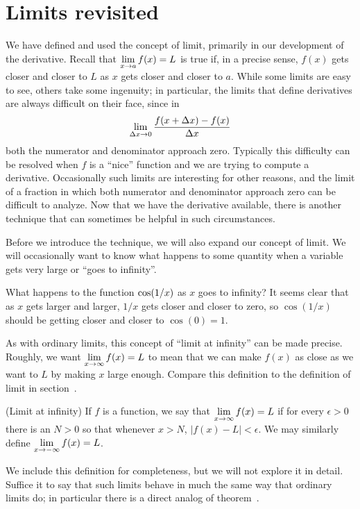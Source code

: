 \section{Limits revisited}{}{}
\nobreak
We have defined and used the concept of limit, primarily in our
development of the derivative. Recall that $\displaystyle \lim_{x\to a}f(x)=L$ is
true if, in a precise sense, $f(x)$ gets closer and closer to $L$ as
$x$ gets closer and closer to $a$. While some limits are easy to see,
others take some ingenuity; in particular, the limits that define
derivatives are always difficult on their face, since in 
$$\lim_{\Delta x\to 0} {f(x+\Delta x)-f(x)\over \Delta x}$$
both the numerator and denominator approach zero. Typically this
difficulty can be resolved when $f$ is a ``nice'' function and we are
trying to compute a derivative. Occasionally such limits are
interesting for other reasons, and the limit of a fraction in which
both numerator and denominator approach zero can be difficult to
analyze. Now that we have the derivative available, there is another
technique that can sometimes be helpful in such circumstances.

Before we introduce the technique, we will also expand our concept of
limit. We will occasionally want to know what happens to some quantity
when a variable gets very large or ``goes to infinity''.

\example
What happens to the function $\displaystyle \cos(1/x)$ as $x$ goes to infinity? It
seems clear that as $x$ gets larger and larger, $1/x$ gets closer and
closer to zero, so $\cos(1/x)$ should be getting closer and closer to 
$\cos(0)=1$.
\endexample

As with ordinary limits, this concept of ``limit at infinity'' can be
made precise. Roughly, we want $\displaystyle \lim_{x\to \infty}f(x)=L$ to mean that
we can make $f(x)$ as close as we want to $L$ by making $x$ large
enough. Compare this definition to the definition of limit in 
section~.

 (Limit at infinity) If $f$ is a function, we say that $\displaystyle \lim_{x\to
  \infty}f(x)=L$ if for every $\epsilon>0$ there is an $N > 0$ so that
  whenever $x>N$, $|f(x)-L|<\epsilon$.
We may similarly define $\displaystyle \lim_{x\to-\infty}f(x)=L$.
\enddef

We include this definition for completeness, but we will not explore it in
detail. Suffice it to say that such limits behave in much the same way
that ordinary limits do; in particular there is a direct analog of 
theorem~.

